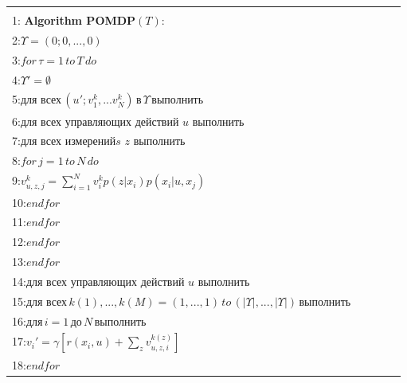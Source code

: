 \documentclass[10pt,a4paper]{article}
\begin{document}
\begin{table}[H]
\begin{center}
\begin{tabular}{|l|}
\hline
{}\\
1:\textbf{ Algorithm POMDP}$(T):$\\
2:\hspace{5mm}$\varUpsilon=(0;0,...,0)$\\
3:\hspace{5mm}$\textit{for}\,\tau=1\,\textit{to}\,T\,\textit{do}$\\
4:\hspace{10mm}$\varUpsilon'=\emptyset$\\
5:\hspace{10mm}$\textit{для всех}\,(u';v_1^k,...v_N^k)\,\textit{в}\,\varUpsilon\,\textit{выполнить}$\\
6:\hspace{15mm}$\textit{для всех управляющих действий u выполнить}$\\
7:\hspace{20mm}$\textit{для всех измеренийs z выполнить}$\\
8:\hspace{25mm}$\textit{for}\,j=1\,\textit{to}\,N\,\textit{do}$\\
9:\hspace{30mm}$v_{u,z,j}^k=\sum_{i=1}^Nv_i^kp(z|x_i)p(x_i|u,x_j)$\\
10:\hspace{24mm}$\textit{endfor}$\\
11:\hspace{19mm}$\textit{endfor}$\\
12:\hspace{14mm}$\textit{endfor}$\\
13:\hspace{9mm}$\textit{endfor}$\\
14:\hspace{9mm}$\textit{для всех управляющих действий u выполнить}$\\
15:\hspace{14mm}$\textit{для всех}\,k(1),...,k(M)=(1,...,1)\,\textit{to}\,(|\varUpsilon|,...,|\varUpsilon|)\,\textit{выполнить}\qquad\qquad$\\
16:\hspace{19mm}$\textit{для}\,i=1\,\textit{до}\,N\,\textit{выполнить}$\\
17:\hspace{24mm}$v_i'=\gamma[r(x_i,u)+\sum_zv_{u,z,i}^{k(z)}]$\\
18:\hspace{19mm}$\textit{endfor}$\\

\end{tabular}
\end{center}
\end{table}
\end{document}
